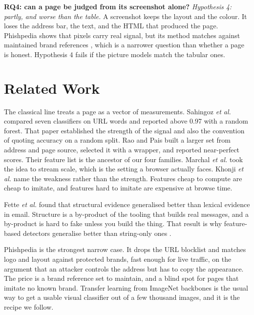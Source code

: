 \documentclass[11pt,journal,a4paper]{IEEEtran}
\begin{document}
\textbf{RQ4: can a page be judged from its screenshot alone?} \emph{Hypothesis 4: partly, and worse than the
table.} A screenshot keeps the layout and the colour. It loses the address bar, the text, and the HTML that
produced the page. Phishpedia shows that pixels carry real signal, but its method matches against maintained brand
references \cite{lin2021phishpedia}, which is a narrower question than whether a page is honest. Hypothesis 4 fails
if the picture models match the tabular ones.

\section{Related Work}

The classical line treats a page as a vector of measurements. Sahingoz \emph{et al.} \cite{sahingoz2019ml}
compared seven classifiers on URL words and reported above 0.97 with a random forest. That paper established the
strength of the signal and also the convention of quoting accuracy on a random split. Rao and Pais
\cite{rao2019detection} built a larger set from address and page source, selected it with a wrapper, and reported
near-perfect scores. Their feature list is the ancestor of our four families. Marchal \emph{et al.}
\cite{marchal2014phishstorm} took the idea to stream scale, which is the setting a browser actually faces. Khonji
\emph{et al.} \cite{khonji2013phishing} name the weakness rather than the strength. Features cheap to compute are
cheap to imitate, and features hard to imitate are expensive at browse time.

Fette \emph{et al.} \cite{fette2007learning} found that structural evidence generalised better than lexical
evidence in email. Structure is a by-product of the tooling that builds real messages, and a by-product is hard to
fake unless you build the thing. That result is why feature-based detectors generalise better than string-only
ones \cite{basit2021comprehensive}.

Phishpedia \cite{lin2021phishpedia} is the strongest narrow case. It drops the URL blocklist and matches logo and
layout against protected brands, fast enough for live traffic, on the argument that an attacker controls the
address but has to copy the appearance. The price is a brand reference set to maintain, and a blind spot for pages
that imitate no known brand. Transfer learning from ImageNet backbones \cite{he2016deep,tan2019efficientnet,howard2019searching}
is the usual way to get a usable visual classifier out of a few thousand images, and it is the recipe we follow.
\end{document}
